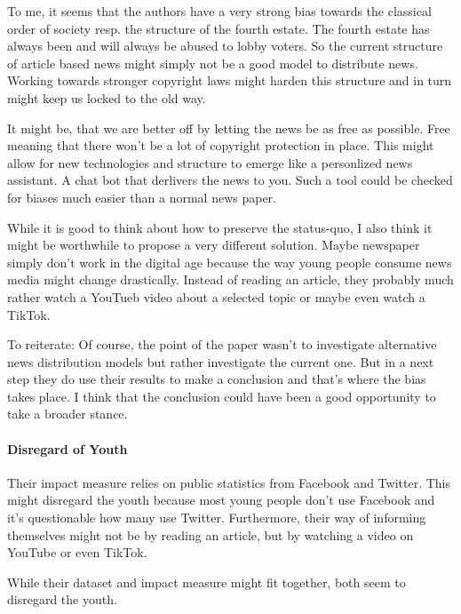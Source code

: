 \documentclass[12pt]{article}
\begin{document}
To me, it seems that the authors have a very
strong bias towards the classical order of society resp. the structure of
the fourth estate. The fourth estate has always been and will always be abused
to lobby voters. So the current structure of article based news might simply
not be a good model to distribute news. Working towards stronger copyright
laws might harden this structure and in turn might keep us locked to the old
way.

It might be, that we are better off by letting the news be as free as possible.
Free meaning that there won't be a lot of copyright protection in place. This
might allow for new technologies and structure to emerge like a personlized
news assistant. A chat bot that derlivers the news to you. Such a tool could
be checked for biases much easier than a normal news paper.

While it is good to think about how to preserve the status-quo, I also think
it might be worthwhile to propose a very different solution. Maybe newspaper
simply don't work in the digital age because the way young people consume
news media might change drastically. Instead of reading an article, they
probably much rather watch a YouTueb video about a selected topic or maybe
even watch a TikTok.

To reiterate: Of course, the point of the paper wasn't to investigate
alternative news distribution models but rather investigate the current one.
But in a next step they do use their results to make a conclusion and that's
where the bias takes place. I think that the conclusion could have been a good
opportunity to take a broader stance.

\paragraph{Disregard of Youth} Their impact measure relies on public
statistics from Facebook and Twitter. This might disregard the youth because
most young people don't use Facebook and it's questionable how many use
Twitter. Furthermore, their way of informing themselves might not be by reading
an article, but by watching a video on YouTube or even TikTok.

While their dataset and impact measure might fit together, both seem to
disregard the youth.
\end{document}
